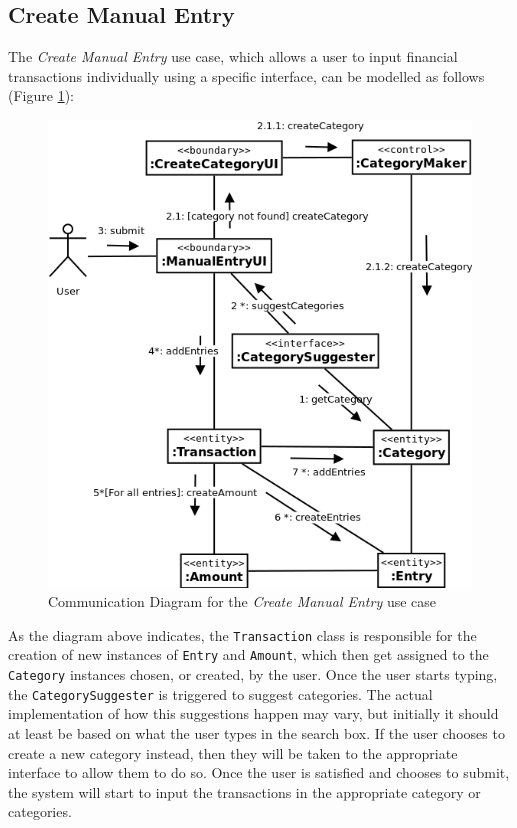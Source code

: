 \subsection{Create Manual Entry} \label{sec:AnalysisAndDesign.ManualEntry}

The \emph{Create Manual Entry} use case, which allows a
user to input financial transactions individually using a specific interface,
can be modelled as follows (Figure \ref{fig:CommDiagram.CreateManualEntry}):
\begin{figure}[ht!]
  \begin{center}
    \includegraphics[width=12cm]{./contents/img/Comm_Diagram_-_Manual_Entry.png}
  \end{center}
  \caption{Communication Diagram for the \emph{Create Manual Entry} use case}
  \label{fig:CommDiagram.CreateManualEntry}
\end{figure}
\FloatBarrier

As the diagram above indicates, the \texttt{Transaction} class is responsible for
the creation of new instances of \texttt{Entry} and \texttt{Amount}, which then get
assigned to the \texttt{Category} instances chosen, or created, by the user.
Once the user starts typing, the \texttt{CategorySuggester} is triggered to
suggest categories. The actual implementation of how this suggestions happen
may vary, but initially it should at least be based on what the user types in
the search box. If the user chooses to create a new category instead, then they
will be taken to the appropriate interface to allow them to do so. Once the
user is satisfied and chooses to submit, the system will start to input the
transactions in the appropriate category or categories.

